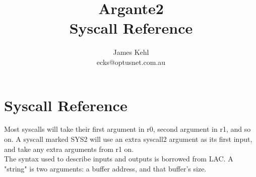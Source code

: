 \documentclass[a4paper,oneside,openany]{book}
\title{\Huge{Argante2}\\\huge{Syscall Reference}}
\author{
	\LARGE{James Kehl}\\
	ecks@optusnet.com.au
}
\begin{document}
\maketitle{}

\newcommand{\scargs}[1]{[ #1 ]}
\newenvironment{scmodule}[4]
{
	\pagebreak[4]
	\section{#1}
	\begin{tabbing}
	\enskip\=\qquad\qquad\qquad\qquad\=\+\kill
	\emph{Author:}\>#2\nopagebreak\\
	\emph{Editor:}\>#3\nopagebreak\\
	\emph{Last Updated:}\>\nopagebreak#4
	\end{tabbing}
	\smallskip
}
{
\smallskip\\
}
\newenvironment{sccall}[2][(SYS2)]
{
	\subsection[#2]{#2 #1}
}
{
}
\chapter{Syscall Reference}
Most syscalls will take their first argument in r0, second argument in r1, and so on. A syscall marked SYS2 will use an extra syscall2 argument as its first input, and take any extra arguments from r1 on.\\
The syntax used to describe inputs and outputs is borrowed from LAC. A "string" is
two arguments: a buffer address, and that buffer's size.






\end{document}
